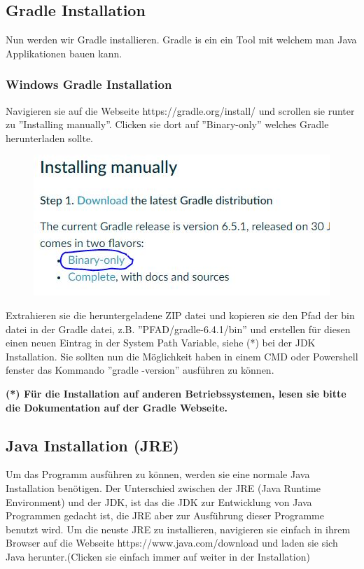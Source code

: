 \documentclass[fontsize=12pt,paper=a4,twoside]{scrartcl}
\begin{document}
\subsection{Gradle Installation}

Nun werden wir Gradle installieren. Gradle is ein ein Tool mit welchem man Java Applikationen bauen kann.

\subsubsection{Windows Gradle Installation}

Navigieren sie auf die Webseite https://gradle.org/install/ und scrollen sie runter zu ''Installing manually''. Clicken sie dort auf ''Binary-only'' welches Gradle herunterladen sollte.
\begin{figure}[h!]
\centering
\includegraphics[width=0.5\linewidth]{GradleDownload.JPG}
\end{figure} 

Extrahieren sie die heruntergeladene ZIP datei und kopieren sie den Pfad der bin datei in der Gradle datei, z.B. ''PFAD/gradle-6.4.1/bin'' und erstellen für diesen einen neuen Eintrag in der System Path Variable, siehe (*) bei der JDK Installation. Sie sollten nun die Möglichkeit haben in einem CMD oder Powershell fenster das Kommando ''gradle -version'' ausführen zu können.

\textbf{(*) Für die Installation auf anderen Betriebssystemen, lesen sie bitte die Dokumentation auf der Gradle Webseite.}


\subsection{Java Installation (JRE)}

Um das Programm ausführen zu können, werden sie eine normale Java Installation benötigen. Der Unterschied zwischen der JRE (Java Runtime Environment) und der JDK, ist das die JDK zur Entwicklung von Java Programmen gedacht ist, die JRE aber zur Ausführung dieser Programme benutzt wird. Um die neuste JRE zu installieren, navigieren sie einfach in ihrem Browser auf die Webseite https://www.java.com/download und laden sie sich Java herunter.(Clicken sie einfach immer auf weiter in der Installation)
\end{document}
